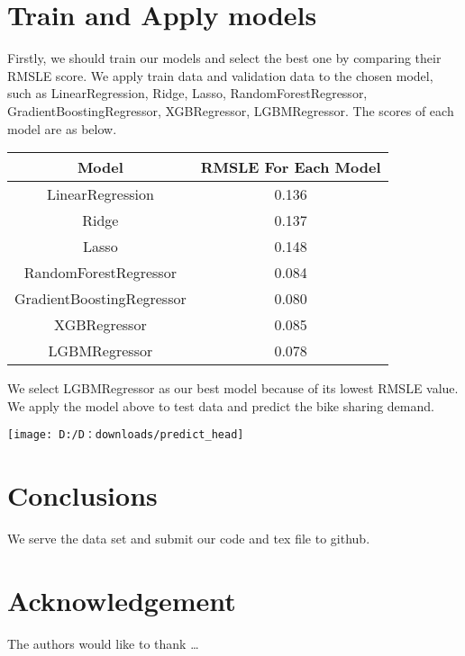 \blindmathtrue
\blindmathfalse
\blinddescription

\qwuMarker %

\section{Train and Apply models} \label{sec-experiment}
\blindtext
Firstly, we should train our models and select the best one by comparing their RMSLE score.
\blindtext
We apply train data and validation data to the chosen model, such as LinearRegression, Ridge, Lasso, RandomForestRegressor,
GradientBoostingRegressor, XGBRegressor, LGBMRegressor.
\blindtext
The scores of each model are as below.

\vspace{.5cm}
\begin{tabular}{ c | c  }
	\toprule
	Model     &  RMSLE For Each Model         \\
	\midrule
	LinearRegression       & 0.136  \\
	
	Ridge       & 0.137  \\
	
	Lasso       & 0.148  \\
	
	RandomForestRegressor       & 0.084  \\
	
	GradientBoostingRegressor       & 0.080  \\
	
	XGBRegressor      & 0.085  \\
	
	LGBMRegressor      & 0.078  \\
	
	\bottomrule
\end{tabular}
\vspace{.5cm}
We select LGBMRegressor as our best model because of its lowest RMSLE value.
\blindtext
We apply the model above to test data and predict the bike sharing demand.

\blindtext
\begin{center}
	\texttt{[image: D:/D：downloads/predict\_head]}
\end{center}


\section{Conclusions} \label{sec-conclusions}

\blindtext
We serve the data set and submit our code and tex file to github.

\section*{Acknowledgement}

\lipsum[1]


The authors would like to thank \ldots

